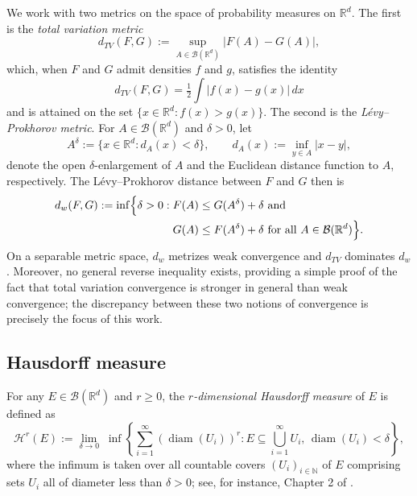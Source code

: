 \documentclass[12pt]{article}
\newcommand{\RR}{\mathbb{R}}
\newcommand{\NN}{\mathbb{N}}
\DeclareMathOperator{\diam}{diam}
\begin{document}
We work with two metrics on the space of probability measures on $\RR^d$. The first is the
\emph{total variation metric}
\begin{equation*}
d_{TV}(F,G) := \sup_{A \in \mathcal{B}(\RR^d)} |F(A) - G(A)|,
\end{equation*}
which, when $F$ and $G$ admit densities $f$ and $g$, satisfies the identity
$$d_{TV}(F,G) = \tfrac{1}{2}\int |f(x)-g(x)|\,dx$$ and is attained on the set
$\{x \in \RR^d : f(x) > g(x)\}$. The second is the \emph{L\'evy--Prokhorov metric}. For
$A \in \mathcal{B}(\RR^d)$ and $\delta > 0$, let
\begin{equation*}
A^{\delta} := \{x \in \RR^d : d_A(x) < \delta\}, \qquad
d_A(x) := \inf_{y \in A}|x-y|,
\end{equation*}
denote the open $\delta$-enlargement of $A$ and the Euclidean distance function to $A$,
respectively. The L\'evy--Prokhorov distance between $F$ and $G$ then is
\begin{align*}
d_w(F,G) := \inf\Bigl\{\delta > 0  :\; & F(A) \leq G(A^{\delta}) + \delta \text{ and }\\
&
G(A) \leq F(A^{\delta}) + \delta \text{ for all } A \in \mathcal{B}(\RR^d)\Bigr\}.
\end{align*}
On a separable metric space, $d_w$ metrizes weak convergence \citep{billingsley1999} and $d_{TV}$ dominates $d_w$ \citep{gibbs2002choosing}. Moreover, no general reverse inequality exists, providing a simple proof of the fact that total variation convergence is stronger in general than weak convergence; the discrepancy between these two notions of convergence is precisely the focus of this work.

\subsection{Hausdorff measure}

For any $E \in\mathcal B(\RR^d)$ and $r\geq 0$, the \emph{$r$-dimensional Hausdorff measure} of $E$ is defined as
\begin{equation*}
\mathcal{H}^{r}(E) := \lim_{\delta \to 0}\; \inf \left\{ \sum_{i=1}^\infty (\diam(U_i))^{r} : E \subseteq \bigcup_{i=1}^\infty U_i,\, \diam(U_i) < \delta \right\},
\end{equation*}
where the infimum is taken over all countable covers $(U_i)_{i\in\NN}$ of $E$ comprising sets $U_i$ all of
diameter less than $\delta>0$; see, for instance, Chapter 2 of \citet{evans2015measure}.
\end{document}
